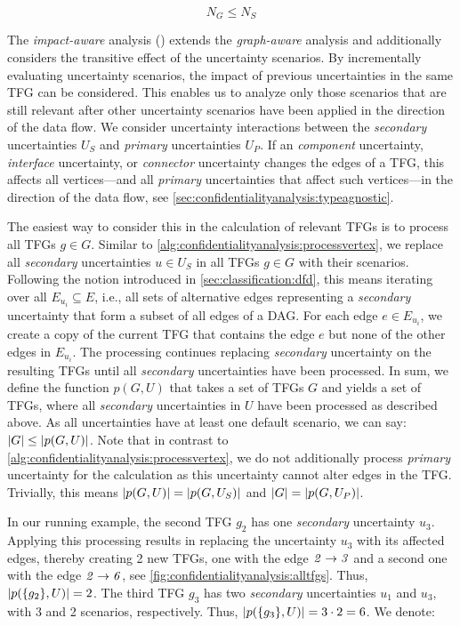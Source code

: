 \begin{equation*}
    N_{G} \leq N_{S}
\end{equation*}


The \emph{impact-aware} analysis () extends the \emph{graph-aware} analysis and additionally considers the transitive effect of the uncertainty scenarios.
By incrementally evaluating uncertainty scenarios, the impact of previous uncertainties in the same \ac{TFG} can be considered.
This enables us to analyze only those scenarios that are still relevant after other uncertainty scenarios have been applied in the direction of the data flow.
We consider uncertainty interactions between the \emph{secondary} uncertainties $U_{S}$ and \emph{primary} uncertainties $U_{P}$.
If an \emph{component} uncertainty, \emph{interface} uncertainty, or \emph{connector} uncertainty changes the edges of a \ac{TFG}, this affects all vertices---and all \emph{primary} uncertainties that affect such vertices---in the direction of the data flow, see \autoref{sec:confidentialityanalysis:typeagnostic}.

The easiest way to consider this in the calculation of relevant \acp{TFG} is to process all \acp{TFG} $g \in G$.
Similar to \autoref{alg:confidentialityanalysis:processvertex}, we replace all \emph{secondary} uncertainties $u \in U_{S}$ in all \acp{TFG} $g \in G$ with their scenarios.
Following the notion introduced in \autoref{sec:classification:dfd}, this means iterating over all $E_{u_{i}} \subseteq E$, i.e., all sets of alternative edges representing a \emph{secondary} uncertainty that form a subset of all edges of a \ac{DAG}.
For each edge $e \in E_{u_{i}}$, we create a copy of the current \ac{TFG} that contains the edge $e$ but none of the other edges in $E_{u_{i}}$.
The processing continues replacing \emph{secondary} uncertainty on the resulting \acp{TFG} until all \emph{secondary} uncertainties have been processed.
In sum, we define the function $p(G,U)$ that takes a set of \acp{TFG} $G$ and yields a set of \acp{TFG}, where all \emph{secondary} uncertainties in $U$ have been processed as described above.
As all uncertainties have at least one default scenario, we can say: $\lvert G\rvert \leq \lvert p(G,U)\rvert$.
Note that in contrast to \autoref{alg:confidentialityanalysis:processvertex}, we do not additionally process \emph{primary} uncertainty for the calculation as this uncertainty cannot alter edges in the \ac{TFG}.
Trivially, this means $\lvert p(G,U)\rvert = \lvert p(G,U_{S})\rvert$ and $\lvert G\rvert = \lvert p(G,U_{P})\rvert$.

In our running example, the second \ac{TFG} $g_{2}$ has one \emph{secondary} uncertainty $u_{3}$.
Applying this processing results in replacing the uncertainty $u_{3}$ with its affected edges, thereby creating 2 new \acp{TFG}, one with the edge $\mathit{2} \rightarrow \mathit{3}$ and a second one with the edge $\mathit{2} \rightarrow \mathit{6}$, see \autoref{fig:confidentialityanalysis:alltfgs}.
Thus, $\lvert p(\{ g_{2} \}, U)\rvert = 2$.
The third \ac{TFG} $g_{3}$ has two \emph{secondary} uncertainties $u_{1}$ and $u_{3}$, with 3 and 2 scenarios, respectively.
Thus, $\lvert p(\{ g_{3} \}, U)\rvert = 3 \cdot 2 = 6$.
We denote: 

